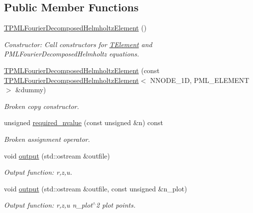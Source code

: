\subsection*{Public Member Functions}
\begin{DoxyCompactItemize}
\item 
\hyperlink{classoomph_1_1TPMLFourierDecomposedHelmholtzElement_a837e85a5e8ada4a8088d0bc251e758e1}{T\+P\+M\+L\+Fourier\+Decomposed\+Helmholtz\+Element} ()
\begin{DoxyCompactList}\small\item\em Constructor\+: Call constructors for \hyperlink{classoomph_1_1TElement}{T\+Element} and P\+M\+L\+Fourier\+Decomposed\+Helmholtz equations. \end{DoxyCompactList}\item 
\hyperlink{classoomph_1_1TPMLFourierDecomposedHelmholtzElement_a98e945f2c505dc8ec7f70a9491b5ee2f}{T\+P\+M\+L\+Fourier\+Decomposed\+Helmholtz\+Element} (const \hyperlink{classoomph_1_1TPMLFourierDecomposedHelmholtzElement}{T\+P\+M\+L\+Fourier\+Decomposed\+Helmholtz\+Element}$<$ N\+N\+O\+D\+E\+\_\+1D, P\+M\+L\+\_\+\+E\+L\+E\+M\+E\+NT $>$ \&dummy)
\begin{DoxyCompactList}\small\item\em Broken copy constructor. \end{DoxyCompactList}\item 
unsigned \hyperlink{classoomph_1_1TPMLFourierDecomposedHelmholtzElement_a8515477053b4a1ade73df88030ca0aff}{required\+\_\+nvalue} (const unsigned \&n) const
\begin{DoxyCompactList}\small\item\em Broken assignment operator. \end{DoxyCompactList}\item 
void \hyperlink{classoomph_1_1TPMLFourierDecomposedHelmholtzElement_a7740f7614bd05db89ddf4e39668b8a75}{output} (std\+::ostream \&outfile)
\begin{DoxyCompactList}\small\item\em Output function\+: r,z,u. \end{DoxyCompactList}\item 
void \hyperlink{classoomph_1_1TPMLFourierDecomposedHelmholtzElement_af0e567c1502be1edd09e7b3378caa1b0}{output} (std\+::ostream \&outfile, const unsigned \&n\+\_\+plot)
\begin{DoxyCompactList}\small\item\em Output function\+: r,z,u n\+\_\+plot$^\wedge$2 plot points. \end{DoxyCompactList}\item 

\end{DoxyCompactItemize}
